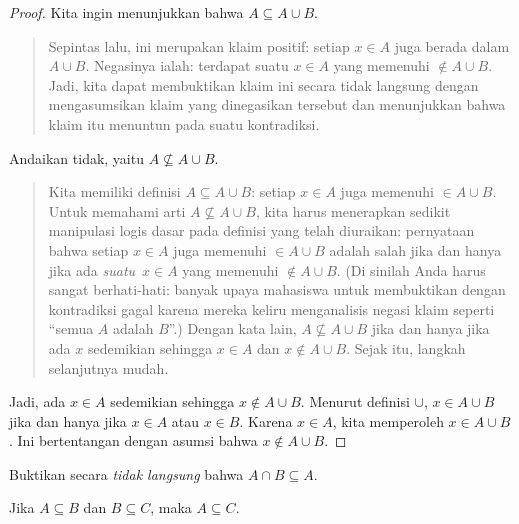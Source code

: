 \documentclass[../../../include/open-logic-section]{subfiles}
\begin{document}
\begin{proof}
  Kita ingin menunjukkan bahwa $A \subseteq A \cup B$.
  \begin{quote}
    Sepintas lalu, ini merupakan klaim positif: setiap $x \in A$ juga
    berada dalam $A \cup B$. Negasinya ialah: terdapat suatu $x \in A$
    yang memenuhi $\notin A \cup B$. Jadi, kita dapat membuktikan
    klaim ini secara tidak langsung dengan mengasumsikan klaim yang
    dinegasikan tersebut dan menunjukkan bahwa klaim itu menuntun pada
    suatu kontradiksi.
  \end{quote}
  Andaikan tidak, yaitu $A \nsubseteq A \cup B$.
  \begin{quote}
    Kita memiliki definisi $A \subseteq A \cup B$: setiap $x \in A$
    juga memenuhi $\in A \cup B$. Untuk memahami arti $A \nsubseteq
    A \cup B$, kita harus menerapkan sedikit manipulasi logis dasar
    pada definisi yang telah diuraikan: pernyataan bahwa setiap $x \in
    A$ juga memenuhi $\in A \cup B$ adalah salah jika dan hanya jika
    ada \emph{suatu}~$x \in A$ yang memenuhi $\notin A \cup B$.
    (Di sinilah Anda harus sangat berhati-hati: banyak upaya mahasiswa
    untuk membuktikan dengan kontradiksi gagal karena mereka keliru
    menganalisis negasi klaim seperti ``semua $A$ adalah $B$''.) Dengan
    kata lain, $A \nsubseteq A \cup B$ jika dan hanya jika ada $x$
    sedemikian sehingga $x \in A$ dan $x \notin A \cup B$. Sejak itu,
    langkah selanjutnya mudah.
  \end{quote}
  Jadi, ada $x \in A$ sedemikian sehingga $x \notin A \cup B$. Menurut
  definisi $\cup$, $x \in A \cup B$ jika dan hanya jika $x \in A$ atau
  $x \in B$. Karena $x \in A$, kita memperoleh $x \in A \cup B$. Ini
  bertentangan dengan asumsi bahwa $x \notin A \cup B$.
\end{proof}

\begin{prob}
Buktikan secara \emph{tidak langsung} bahwa $A \cap B \subseteq A$.
\end{prob}

\begin{prop}
Jika $A \subseteq B$ dan $B \subseteq C$, maka $A \subseteq C$.
\end{prop}
\end{document}
